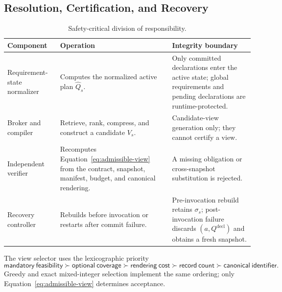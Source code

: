 \subsection{Resolution, Certification, and Recovery}
\begin{table}[H]
\centering
\normalsize
\renewcommand{\arraystretch}{1.15}
\caption{Safety-critical division of responsibility.}
\begin{tabularx}{0.94\textwidth}{@{}p{} X X@{}}
\toprule
\textbf{Component} & \textbf{Operation} & \textbf{Integrity boundary} \\
\midrule
Requirement-state normalizer & Computes the normalized active plan $\widehat Q_s$. & Only committed declarations enter the active state; global requirements and pending declarations are runtime-protected. \\
Broker and compiler & Retrieve, rank, compress, and construct a candidate $V_s$. & Candidate-view generation only; they cannot certify a view. \\
Independent verifier & Recomputes Equation~\eqref{eq:admissible-view} from the contract, snapshot, manifest, budget, and canonical rendering. & A missing obligation or cross-snapshot substitution is rejected. \\
Recovery controller & Rebuilds before invocation or restarts after commit failure. & Pre-invocation rebuild retains $\sigma_s$; post-invocation failure discards $(a,Q^{\mathrm{decl}})$ and obtains a fresh snapshot. \\
\bottomrule
\end{tabularx}
\end{table}
The view selector uses the lexicographic priority
\[
\mathsf{mandatory\ feasibility}\succ\mathsf{optional\ coverage}\succ
\mathsf{rendering\ cost}\succ\mathsf{record\ count}\succ
\mathsf{canonical\ identifier}.
\]
Greedy and exact mixed-integer selection implement the same ordering; only Equation~\eqref{eq:admissible-view} determines acceptance.
